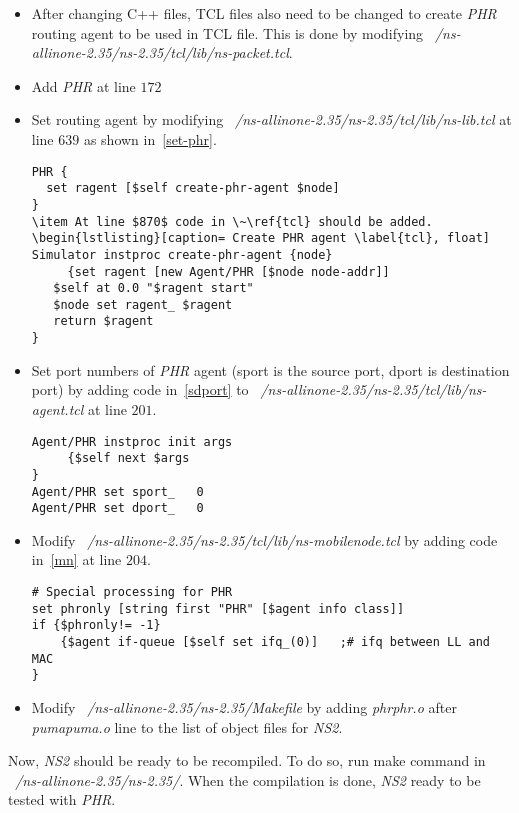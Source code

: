 \documentclass{article}
\begin{document}
\begin{itemize}
\item After changing C++ files, TCL files also need to be changed to create \emph{PHR} routing agent to be 
 used in TCL file. This is done by modifying \emph{~/ns-allinone-2.35/ns-2.35/tcl/lib/ns-packet.tcl}.
\item Add \emph{PHR} at line $172$
\item Set routing agent by modifying \emph{~/ns-allinone-2.35/ns-2.35/tcl/lib/ns-lib.tcl} at line $639$ as
shown in~\ref{set-phr}.

\lstset{language=TCL}
\begin{lstlisting}[caption= Set PHR agent \label{set-phr} ,float]
PHR {
  set ragent [$self create-phr-agent $node]
}
\item At line $870$ code in \~\ref{tcl} should be added.
\begin{lstlisting}[caption= Create PHR agent \label{tcl}, float]
Simulator instproc create-phr-agent {node}
	 {set ragent [new Agent/PHR [$node node-addr]]
   $self at 0.0 "$ragent start"
   $node set ragent_ $ragent
   return $ragent
}
\end{lstlisting}
 
\item Set port numbers of \emph{PHR} agent (sport is the source port, dport is destination port)
 by adding code in~\ref{sdport} to \emph{~/ns-allinone-2.35/ns-2.35/tcl/lib/ns-agent.tcl} at line $201$.
\begin{lstlisting}[caption=Set ports of PHR agent \label{sdport} ,float]
Agent/PHR instproc init args
	 {$self next $args
}
Agent/PHR set sport_   0
Agent/PHR set dport_   0
\end{lstlisting}


\item Modify \emph{~/ns-allinone-2.35/ns-2.35/tcl/lib/ns-mobilenode.tcl} by adding code in~\ref{mn} at line $204$.
\begin{lstlisting}[caption=Set ports of PHR agent \label{mn} ,float]
# Special processing for PHR
set phronly [string first "PHR" [$agent info class]]
if {$phronly!= -1} 
	{$agent if-queue [$self set ifq_(0)]   ;# ifq between LL and MAC
}
\end{lstlisting}


\item Modify \emph{~/ns-allinone-2.35/ns-2.35/Makefile} by adding \emph{phr\/phr.o} after \emph{puma\/puma.o } line
 to the list of object files for \emph{NS2}.
 
 \end{itemize}
Now, \emph{NS2} should be ready to be recompiled. To do so, run make command in 
\emph{~/ns-allinone-2.35/ns-2.35/}. When the compilation is done, \emph{NS2} ready to be tested with \emph{PHR}.
\end{document}
